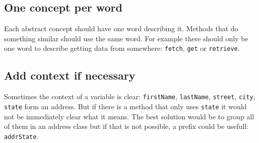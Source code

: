 \subsection{One concept per word}
Each abstract concept should have one word describing it. Methods that do something similar should use the same word. For example there should only be one word to describe getting data from somewhere: \texttt{fetch}, \texttt{get} or \texttt{retrieve}.

\subsection{Add context if necessary}
Sometimes the context of a variable is clear: \texttt{firstName}, \texttt{lastName}, \texttt{street}, \texttt{city}, \texttt{state} form an address. But if there is a method that only uses \texttt{state} it would not be immediately clear what it means. The best solution would be to group all of them in an address class but if that is not possible, a prefix could be usefull: \texttt{addrState}.
